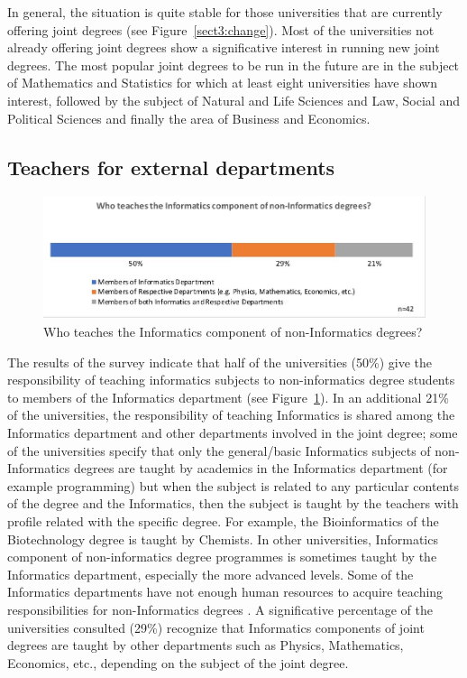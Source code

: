 In general, the situation is  quite stable for those universities that are currently offering joint degrees (see Figure~\ref{sect3:change}). Most of the universities not already offering joint degrees show a significative interest in running new joint degrees. The most popular joint degrees to be run in the future are in the subject of Mathematics and Statistics for which at least eight universities have shown interest, followed by the subject of 
Natural and Life Sciences  and 
Law, Social and Political Sciences and finally the area of  Business and Economics. 

\subsection{Teachers for external departments}
\begin{figure}[h]
\includegraphics[width = \linewidth]{charts/2c.jpg}
\caption{Who teaches the Informatics component of non-Informatics degrees?}
\label{sect3:teachers}
\end{figure}

The results of the survey indicate that half of the universities (50\%) give the responsibility of teaching informatics subjects to non-informatics degree students to members of the Informatics department (see Figure~\ref{sect3:teachers}). In an additional 21\% of the universities, the responsibility of teaching Informatics is shared among the Informatics department and other departments involved in the joint degree; some of the universities specify that only the general/basic Informatics subjects of non-Informatics degrees are taught by academics in the Informatics department (for example programming) but when the subject is related to any particular contents of the degree and the Informatics, then the subject is taught by the teachers with profile related with the specific degree. For example, the Bioinformatics of the Biotechnology degree is taught by Chemists. In other universities, Informatics component of non-informatics degree programmes is sometimes taught by the Informatics department, especially the more advanced levels. Some of the Informatics departments have not enough human resources to acquire teaching responsibilities  for non-Informatics degrees . A significative percentage of the universities consulted (29\%) recognize that Informatics components of joint degrees are taught by other departments such as Physics, Mathematics, Economics, etc., depending on the subject of the joint degree.

